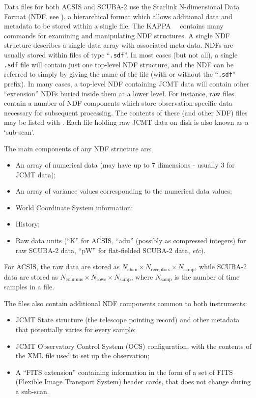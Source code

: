 \documentclass[oneside,11pt]{starlink}
\begin{document}
Data files for both ACSIS and SCUBA-2 \cite{sc2ic01} use the Starlink N-dimensional
Data Format (NDF, see \ndf), a hierarchical format which allows
additional data and metadata to be stored within a single file. The KAPPA
\KAPPA\ \ contains many commands for
examining and manipulating NDF structures. A single
NDF structure describes a single data array with associated meta-data.
NDFs are usually stored within files of type ``\verb+.sdf+''. In most
cases (but not all), a single \verb+.sdf+ file will contain just one
top-level NDF structure, and the NDF can be referred to simply by
giving the name of the file (with or without the ``\verb+.sdf+'' prefix).
In many cases, a top-level NDF containing JCMT data will contain other
``extension'' NDFs buried inside them at a lower level. For instance, raw
files contain a number of NDF components which store
observation-specific data necessary for subsequent processing. The
contents of these (and other NDF) files may be listed with
\HDSTRACEref. Each file holding raw JCMT data on disk is also known as a
`sub-scan'.

The main components of any NDF structure are:
\begin{itemize}
\item An array of numerical data (may have up to 7 dimensions - usually 3
for JCMT data);
\item An array of variance values corresponding to the numerical data
values;
\item World Coordinate System information;
\item History;
\item Raw data units (``K'' for ACSIS, ``adu'' (possibly as compressed integers)
for raw SCUBA-2 data,  ``pW'' for flat-fielded SCUBA-2 data, \emph{etc}).
\end{itemize}
For ACSIS, the raw data are stored as $N_{\textrm{chan}} \times N_{\textrm{receptors}} \times N_{\textrm{samp}}$, while SCUBA-2 data are stored as
$N_{\textrm{columns}} \times N_{\textrm{rows}} \times N_{\textrm{samp}}$, where
$N_{\textrm{samp}}$ is the number of time samples in a file.

The files also contain additional NDF components common to both
instruments:
\begin{itemize}
\item JCMT State structure (the telescope pointing record) and other
  metadata that potentially varies for every sample;
\item JCMT Observatory Control System (OCS) configuration, with the
  contents of the XML file used to set up the observation;
\item A ``FITS extension'' containing information in the form of a set of
  FITS (Flexible Image Transport System) header cards, that does not
  change during a sub-scan.
\end{itemize}
\end{document}
